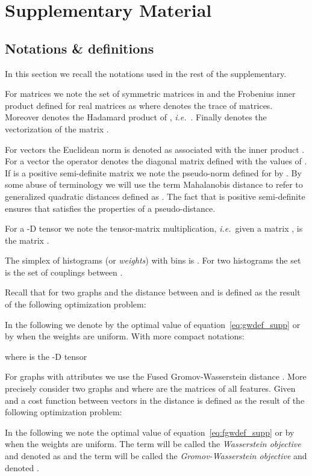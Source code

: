 \documentclass{article}
\def\eqref#1{equation~\ref{#1}}
\newcommand{\ie}{\textit{i.e.}}
\begin{document}
	
	
	\newpage
	
	\onecolumn
	\section{Supplementary Material}
	\subsection{Notations \& definitions}\label{sec:defs}
	In this section we recall the notations used in the rest of the supplementary. 
	
	For matrices we note   the set of symmetric matrices in  and  the Frobenius inner product defined for real matrices  as  where  denotes the trace of matrices. Moreover  denotes the Hadamard product of , \ie\ . Finally  denotes the vectorization of the matrix .
	
	For vectors the Euclidean norm is denoted as  associated with the inner product . For a vector  the operator  denotes the diagonal matrix defined with the values of . If  is a positive semi-definite matrix we note  the pseudo-norm defined for  by . By some abuse of terminology we will use the term Mahalanobis distance to refer to generalized quadratic distances defined as . The fact that  is positive semi-definite ensures that  satisfies the
	properties of a pseudo-distance. 
	
	For a -D tensor  we note  the tensor-matrix multiplication, \ie\ given a matrix ,  is the matrix .
	
	The simplex of histograms (or \emph{weights}) with  bins is . For two histograms  the set  is the set of couplings between . 
	
	Recall that for two graphs  and  the  distance between  and  is defined as the result of the following optimization problem:
	
	In the following we denote by  the optimal value of \eqref{eq:gwdef_supp} or  by  when the weights are uniform. With more compact notations:
	
	where  is the -D tensor 
	
	For graphs with attributes we use the Fused Gromov-Wasserstein distance \cite{vayer-optimal-nodate}. More precisely consider two graphs  and  where  are the matrices of all features. Given  and a cost function  between vectors in  the  distance is defined as the result of the following optimization problem:
	
	In the following we note  the optimal value of \eqref{eq:fgwdef_supp} or by  when the weights are uniform. The term  will be called the \emph{Wasserstein objective} and denoted as  and the term  will be called the \emph{Gromov-Wasserstein objective} and denoted .
	
\end{document}

